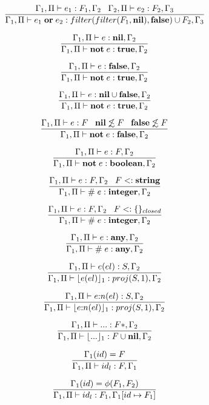 \[
\dfrac{\Gamma_{1}, \Pi \vdash e_{1}:F_{1}, \Gamma_{2} \;\;\;
       \Gamma_{2}, \Pi \vdash e_{2}:F_{2}, \Gamma_{3}}
      {\Gamma_{1}, \Pi \vdash e_{1} \; \mathbf{or} \; e_{2}:filter(filter(F_{1}, \mathbf{nil}), \mathbf{false}) \cup F_{2}, \Gamma_{3}}
\]

\[
\dfrac{\Gamma_{1}, \Pi \vdash e:\mathbf{nil}, \Gamma_{2}}
      {\Gamma_{1}, \Pi \vdash \mathbf{not} \; e:\mathbf{true}, \Gamma_{2}}
\]

\[
\dfrac{\Gamma_{1}, \Pi \vdash e:\mathbf{false}, \Gamma_{2}}
      {\Gamma_{1}, \Pi \vdash \mathbf{not} \; e:\mathbf{true}, \Gamma_{2}}
\]

\[
\dfrac{\Gamma_{1}, \Pi \vdash e:\mathbf{nil} \cup \mathbf{false}, \Gamma_{2}}
      {\Gamma_{1}, \Pi \vdash \mathbf{not} \; e:\mathbf{true}, \Gamma_{2}}
\]

\[
\dfrac{\Gamma_{1}, \Pi \vdash e:F \;\;\;
       \mathbf{nil} \not\lesssim F \;\;\;
       \mathbf{false} \not\lesssim F}
      {\Gamma_{1}, \Pi \vdash \mathbf{not} \; e:\mathbf{false}, \Gamma_{2}}
\]

\[
\dfrac{\Gamma_{1}, \Pi \vdash e:F, \Gamma_{2}}
      {\Gamma_{1}, \Pi \vdash \mathbf{not} \; e:\mathbf{boolean}, \Gamma_{2}}
\]

\[
\dfrac{\Gamma_{1}, \Pi \vdash e:F, \Gamma_{2} \;\;\;
       F <: \mathbf{string}}
      {\Gamma_{1}, \Pi \vdash \# \; e:\mathbf{integer}, \Gamma_{2}}
\]

\[
\dfrac{\Gamma_{1}, \Pi \vdash e:F, \Gamma_{2} \;\;\;
       F <: \{\}_{closed}}
      {\Gamma_{1}, \Pi \vdash \# \; e:\mathbf{integer}, \Gamma_{2}}
\]

\[
\dfrac{\Gamma_{1}, \Pi \vdash e:\mathbf{any}, \Gamma_{2}}
      {\Gamma_{1}, \Pi \vdash \# \; e:\mathbf{any}, \Gamma_{2}}
\]

\[
\dfrac{\Gamma_{1}, \Pi \vdash e(el):S, \Gamma_{2}}
      {\Gamma_{1}, \Pi \vdash \lfloor e(el) \rfloor_{1}:proj(S,1), \Gamma_{2}}
\]

\[
\dfrac{\Gamma_{1}, \Pi \vdash e{:}n(el):S, \Gamma_{2}}
      {\Gamma_{1}, \Pi \vdash \lfloor e{:}n(el) \rfloor_{1}:proj(S,1), \Gamma_{2}}
\]

\[
\dfrac{\Gamma_{1}, \Pi \vdash {...}:F{*}, \Gamma_{2}}
      {\Gamma_{1}, \Pi \vdash \lfloor {...} \rfloor_{1}:F \cup \mathbf{nil}, \Gamma_{2}}
\]

\[
\dfrac{\Gamma_{1}(id) = F}
      {\Gamma_{1}, \Pi \vdash id_{l}:F, \Gamma_{1}}
\]

\[
\dfrac{\Gamma_{1}(id) = \phi(F_{1},F_{2})}
      {\Gamma_{1}, \Pi \vdash id_{l}:F_{1}, \Gamma_{1}[id \mapsto F_{1}]}
\]

